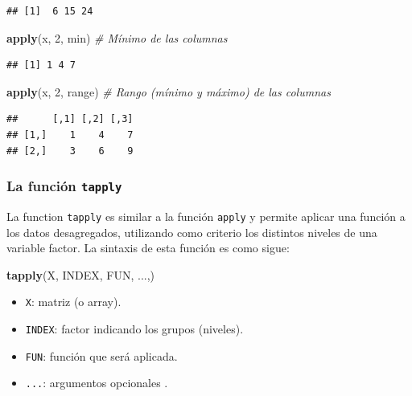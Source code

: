 \documentclass[]{book}
\newenvironment{Shaded}{\begin{snugshade}}{\end{snugshade}}
\newcommand{\CommentTok}[1]{\textcolor[rgb]{0.56,0.35,0.01}{\textit{#1}}}
\newcommand{\DecValTok}[1]{\textcolor[rgb]{0.00,0.00,0.81}{#1}}
\newcommand{\KeywordTok}[1]{\textcolor[rgb]{0.13,0.29,0.53}{\textbf{#1}}}
\newcommand{\NormalTok}[1]{#1}
\providecommand{\tightlist}{%
  \setlength{\itemsep}{0pt}\setlength{\parskip}{0pt}}
\begin{document}
\begin{verbatim}
## [1]  6 15 24
\end{verbatim}

\begin{Shaded}
\begin{Highlighting}[]
\KeywordTok{apply}\NormalTok{(x, }\DecValTok{2}\NormalTok{, min)    }\CommentTok{# Mínimo de las columnas}
\end{Highlighting}
\end{Shaded}

\begin{verbatim}
## [1] 1 4 7
\end{verbatim}

\begin{Shaded}
\begin{Highlighting}[]
\KeywordTok{apply}\NormalTok{(x, }\DecValTok{2}\NormalTok{, range)  }\CommentTok{# Rango (mínimo y máximo) de las columnas}
\end{Highlighting}
\end{Shaded}

\begin{verbatim}
##      [,1] [,2] [,3]
## [1,]    1    4    7
## [2,]    3    6    9
\end{verbatim}

\hypertarget{la-funcion-tapply}{%
\subsubsection{\texorpdfstring{La función \texttt{tapply}}{La función tapply}}\label{la-funcion-tapply}}

La function \texttt{tapply} es
similar a la función \texttt{apply} y permite aplicar una función a los datos desagregados,
utilizando como criterio los distintos niveles de una variable factor.
La sintaxis de esta función es como sigue:

\begin{Shaded}
\begin{Highlighting}[]
    \KeywordTok{tapply}\NormalTok{(X, INDEX, FUN, ...,)}
\end{Highlighting}
\end{Shaded}

\begin{itemize}
\tightlist
\item
  \texttt{X}: matriz (o array).
\item
  \texttt{INDEX}: factor indicando los grupos (niveles).
\item
  \texttt{FUN}: función que será aplicada.
\item
  \texttt{...}: argumentos opcionales .
\end{itemize}
\end{document}
